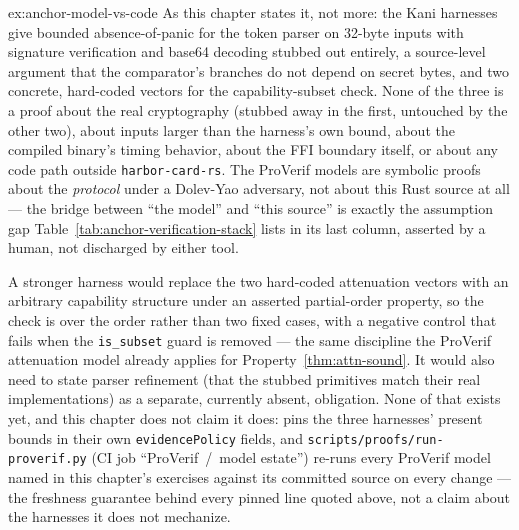 \documentclass[11pt,a4paper]{article}
\theoremstyle{definition}
\begin{document}
\begin{pdsolution}{ex:anchor-model-vs-code}
As this chapter states it, not more: the Kani harnesses give bounded absence-of-panic for the token parser on 32-byte inputs with signature verification and base64 decoding stubbed out entirely, a source-level argument that the comparator's branches do not depend on secret bytes, and two concrete, hard-coded vectors for the capability-subset check. None of the three is a proof about the real cryptography (stubbed away in the first, untouched by the other two), about inputs larger than the harness's own bound, about the compiled binary's timing behavior, about the FFI boundary itself, or about any code path outside \texttt{harbor-card-rs}. The ProVerif models are symbolic proofs about the \emph{protocol} under a Dolev-Yao adversary, not about this Rust source at all --- the bridge between ``the model'' and ``this source'' is exactly the assumption gap Table~\ref{tab:anchor-verification-stack} lists in its last column, asserted by a human, not discharged by either tool.

A stronger harness would replace the two hard-coded attenuation vectors with an arbitrary capability structure under an asserted partial-order property, so the check is over the order rather than two fixed cases, with a negative control that fails when the \texttt{is\_subset} guard is removed --- the same discipline the ProVerif attenuation model already applies for Property~\ref{thm:attn-sound}. It would also need to state parser refinement (that the stubbed primitives match their real implementations) as a separate, currently absent, obligation. None of that exists yet, and this chapter does not claim it does:  pins the three harnesses' present bounds in their own \texttt{evidencePolicy} fields, and \texttt{scripts/proofs/run-proverif.py} (CI job ``ProVerif~/~model estate'') re-runs every ProVerif model named in this chapter's exercises against its committed source on every change --- the freshness guarantee behind every pinned line quoted above, not a claim about the harnesses it does not mechanize.
\end{pdsolution}

\end{document}
